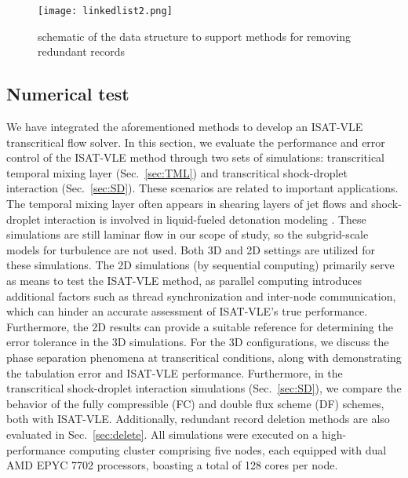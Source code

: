 \begin{figure}[htbp]
	\centering
	\texttt{[image: linkedlist2.png]}
	\caption{schematic of the data structure to support methods for removing redundant records}
	\label{ISAT_LL}
\end{figure}


\subsection{Numerical test}
We have integrated the aforementioned methods to develop an ISAT-VLE transcritical flow solver. In this section, we evaluate the performance and error control of the ISAT-VLE method through two sets of simulations: transcritical temporal mixing layer (Sec.~\ref{sec:TML}) and transcritical shock-droplet interaction (Sec.~\ref{sec:SD}). These scenarios are related to important applications. The temporal mixing layer often appears in shearing layers of jet flows and shock-droplet interaction is involved in liquid-fueled detonation modeling \cite{schwer2018liquid}. These simulations are still laminar flow in our scope of study, so the subgrid-scale models for turbulence are not used.  Both 3D and 2D settings are utilized for these simulations. The 2D simulations (by sequential computing) primarily serve as means to test the ISAT-VLE method, as parallel computing introduces additional factors such as thread synchronization and inter-node communication, which can hinder an accurate assessment of ISAT-VLE's true performance. Furthermore, the 2D results can provide a suitable reference for determining the error tolerance in the 3D simulations. For the 3D configurations, we discuss the phase separation phenomena at transcritical conditions, along with demonstrating the tabulation error and ISAT-VLE performance. 
Furthermore, in the transcritical shock-droplet interaction simulations (Sec.~\ref{sec:SD}), we compare the behavior of the fully compressible (FC) and double flux scheme (DF) schemes, both with ISAT-VLE. Additionally, redundant record deletion methods are also evaluated in Sec.~\ref{sec:delete}.
All simulations were executed on a high-performance computing cluster comprising five nodes, each equipped with dual AMD EPYC 7702 processors, boasting a total of 128 cores per node.
